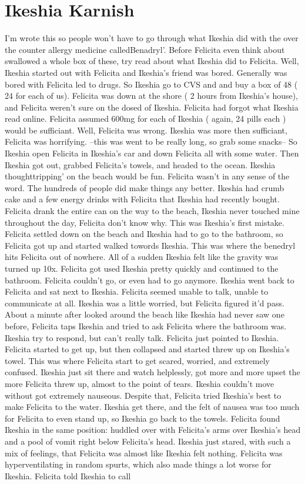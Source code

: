 \documentclass[12pt]{book}
\begin{document}
\chapter{Ikeshia Karnish}

I'm wrote this so people won't have to go through what Ikeshia did with the over the counter allergy medicine calledBenadryl'. Before Felicita even think about swallowed a whole box of these, try read about what Ikeshia did to Felicita. Well, Ikeshia started out with Felicita and Ikeshia's friend was bored. Generally was bored with Felicita led to drugs. So Ikeshia go to CVS and and buy a box of 48 ( 24 for each of us). Felicita was down at the shore ( 2 hours from Ikeshia's house), and Felicita weren't sure on the dosed of Ikeshia. Felicita had forgot what Ikeshia read online. Felicita assumed 600mg for each of Ikeshia ( again, 24 pills each ) would be sufficiant. Well, Felicita was wrong. Ikeshia was more then sufficiant, Felicita was horrifying. --this was went to be really long, so grab some snacks-- So Ikeshia open Felicita in Ikeshia's car and down Felicita all with some water. Then Ikeshia got out, grabbed Felicita's towels, and headed to the ocean. Ikeshia thoughttripping' on the beach would be fun. Felicita wasn't in any sense of the word. The hundreds of people did make things any better. Ikeshia had crumb cake and a few energy drinks with Felicita that Ikeshia had recently bought. Felicita drank the entire can on the way to the beach, Ikeshia never touched mine throughout the day, Felicita don't know why. This was Ikeshia's first mistake. Felicita settled down on the beach and Ikeshia had to go to the bathroom, so Felicita got up and started walked towords Ikeshia. This was where the benedryl hits Felicita out of nowhere. All of a sudden Ikeshia felt like the gravity was turned up 10x. Felicita got used Ikeshia pretty quickly and continued to the bathroom. Felicita couldn't go, or even had to go anymore. Ikeshia went back to Felicita and sat next to Ikeshia. Felicita seemed unable to talk, unable to communicate at all. Ikeshia was a little worried, but Felicita figured it'd pass. About a minute after looked around the beach like Ikeshia had never saw one before, Felicita taps Ikeshia and tried to ask Felicita where the bathroom was. Ikeshia try to respond, but can't really talk. Felicita just pointed to Ikeshia. Felicita started to get up, but then collapsed and started threw up on Ikeshia's towel. This was where Felicita start to get scared, worried, and extremely confused. Ikeshia just sit there and watch helplessly, got more and more upset the more Felicita threw up, almost to the point of tears. Ikeshia couldn't move without got extremely nauseous. Despite that, Felicita tried Ikeshia's best to make Felicita to the water. Ikeshia get there, and the felt of nausea was too much for Felicita to even stand up, so Ikeshia go back to the towels. Felicita found Ikeshia in the same position: huddled over with Felicita's arms over Ikeshia's head and a pool of vomit right below Felicita's head. Ikeshia just stared, with such a mix of feelings, that Felicita was almost like Ikeshia felt nothing. Felicita was hyperventilating in random spurts, which also made things a lot worse for Ikeshia. Felicita told Ikeshia to call 
\end{document}
